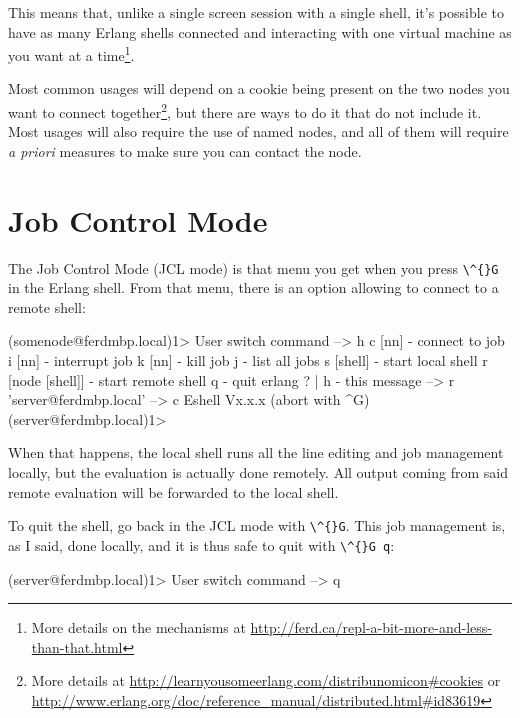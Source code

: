\documentclass[11pt, oneside]{book}   	%
\newcommand{\command}[1]{\Verb`#1`}
\begin{document}
This means that, unlike a single screen session with a single shell, it's possible to have as many Erlang shells connected and interacting with one virtual machine as you want at a time\footnote{More details on the mechanisms at \href{http://ferd.ca/repl-a-bit-more-and-less-than-that.html}{http://ferd.ca/repl-a-bit-more-and-less-than-that.html}}.

Most common usages will depend on a cookie being present on the two nodes you want to connect together\footnote{More details at \href{http://learnyousomeerlang.com/distribunomicon\#cookies}{http://learnyousomeerlang.com/distribunomicon\#cookies} or \href{http://www.erlang.org/doc/reference\_manual/distributed.html\#id83619}{http://www.erlang.org/doc/reference\_manual/distributed.html\#id83619}}, but there are ways to do it that do not include it. Most usages will also require the use of named nodes, and all of them will require \emph{a priori} measures to make sure you can contact the node.

\section{Job Control Mode}

The Job Control Mode (JCL mode) is that menu you get when you press \command{\^{}G} in the Erlang shell. From that menu, there is an option allowing to connect to a remote shell:

\begin{VerbatimEshell}
(somenode@ferdmbp.local)1>
User switch command
 --> h
  c [nn]            - connect to job
  i [nn]            - interrupt job
  k [nn]            - kill job
  j                 - list all jobs
  s [shell]         - start local shell
  r [node [shell]]  - start remote shell
  q                 - quit erlang
  ? | h             - this message
 --> r 'server@ferdmbp.local'
 --> c
Eshell Vx.x.x  (abort with ^G)
(server@ferdmbp.local)1>
\end{VerbatimEshell}

When that happens, the local shell runs all the line editing and job management locally, but the evaluation is actually done remotely. All output coming from said remote evaluation will be forwarded to the local shell.

To quit the shell, go back in the JCL mode with \command{\^{}G}. This job management is, as I said, done locally, and it is thus safe to quit with \command{\^{}G q}:

\begin{VerbatimEshell}
(server@ferdmbp.local)1>
User switch command
 --> q
\end{VerbatimEshell}
\end{document}
